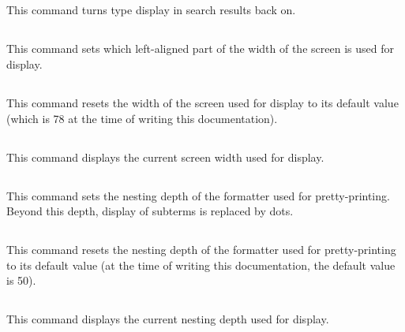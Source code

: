 \subsection[\tt Unset Search Output Name Only.]{}
This command turns type display in search results back on.

\subsection[\tt Set Printing Width {\integer}.]{}
\label{SetPrintingWidth}
This command sets which left-aligned part of the width of the screen
is used for display. 

\subsection[\tt Unset Printing Width.]{}
This command resets the width of the screen used for display to its
default value (which is 78 at the time of writing this documentation).

\subsection[\tt Test Printing Width.]{}
This command displays the current screen width used for display.

\subsection[\tt Set Printing Depth {\integer}.]{}
This command sets the nesting depth of the formatter used for
pretty-printing. Beyond this depth, display of subterms is replaced by
dots. 

\subsection[\tt Unset Printing Depth.]{}
This command resets the nesting depth of the formatter used for
pretty-printing to its default value (at the
time of writing this documentation, the default value is 50).

\subsection[\tt Test Printing Depth.]{}
This command displays the current nesting depth used for display.

